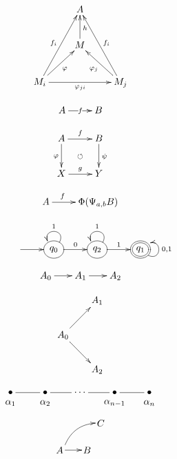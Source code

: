 \documentclass{article}
\begin{document}
\[
\xymatrix{
& A & \\
& M \ar[u]_h & \\
M_i \ar[rr]_{\varphi_{ji}} \ar[ruu]^{f_i} \ar[ru]_{\varphi} & & M_j \ar[luu]_{f_i} \ar[lu]^{\varphi_j} \\
}
\]

\[
\xymatrix{
A \ar[r] |f & B\\
}
\]

\[
\xymatrix{
A \ar[d]_{\varphi} \ar[r]^f \ar@{}[dr]|\circlearrowleft & B \ar[d]^{\psi} \\
X \ar[r]^g & Y \\
}
\]

\[
\xymatrix{A\ar[r]^(0.32){f} & \Phi(\Psi_{a,b}B)}
\]

\[
\xymatrix {
& \ar[r] &
*++[o][F-]{q_0} \ar@(ur,ul)_1 \ar[r]^0 &
*++[o][F-]{q_2} \ar@(ur,ul)_1 \ar[r]^1 &
*++[o][F=]{q_1} \ar@(dr,ur)_{0,1}
}
\]

\[
    \xygraph{
        {A_0} : [r] {A_1} : [r] {A_2}
    }
\]

\[
    \xygraph{
        {A_0}
        (
            :[ru] {A_1},
            :[rd] {A_2}
        )
    }
\]

\[
 \xygraph{
    \bullet ([]!{+(0,-.3)} {\alpha_1}) - [r]
    \bullet ([]!{+(0,-.3)} {\alpha_2}) - [r] \cdots - [r]
    \bullet ([]!{+(0,-.3)} {\alpha_{n - 1}}) - [r]
    \bullet ([]!{+(0,-.3)} {\alpha_n})}
\]

\[
    \begin{xy}
    (0,0)="A"*{A},+/r1cm/="B"*{B},
    "A"+<1.5cm,1cm>="C"*{C}
    \ar "A"+/r.2cm/;"B"+/l.2cm/
    \ar@/^/ "A"+<.2cm,.2cm>;"C"+/l.2cm/
    \end{xy}
\]
\end{document}
